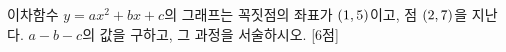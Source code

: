이차함수 $y=ax^2+bx+c$의 그래프는 꼭짓점의 좌표가 $(1{,}\mkern3mu 5)$이고, 점 $(2{,}\mkern3mu 7)$을 지난다. $a-b-c$의 값을 구하고, 그 과정을 서술하시오.  \mbox{[6점]}
